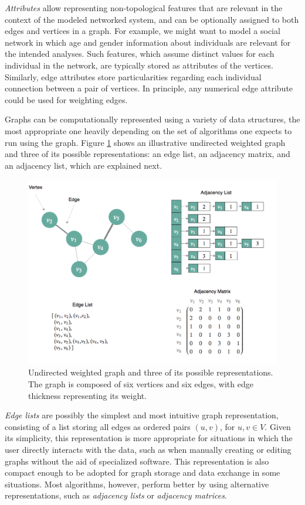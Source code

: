 \textit{Attributes} allow representing non-topological features that are relevant in the context of the modeled networked system, and can be optionally assigned to both edges and vertices in a graph.
For example, we might want to model a social network in which age and gender information about individuals are relevant for the intended analyses.
Such features, which assume distinct values for each individual in the network, are typically stored as attributes of the vertices.
Similarly, edge attributes store particularities regarding each individual connection between a pair of vertices.
In principle, any numerical edge attribute could be used for weighting edges.

Graphs can be computationally represented using a variety of data structures, the most appropriate one heavily depending on the set of algorithms one expects to run using the graph.
Figure \ref{fig:graphs} shows an illustrative undirected weighted graph and three of its possible representations: an edge list, an adjacency matrix, and an adjacency list, which are explained next.

\begin{figure}[h!]
  	\centering
    \includegraphics[width=0.9\linewidth]{figures/network_models/graphs.png}
    \caption[Undirected weighted graph and three of its possible representations]{Undirected weighted graph and three of its possible representations. The graph is composed of six vertices and six edges, with edge thickness representing its weight.}
    \label{fig:graphs}
  \end{figure}
  

\textit{Edge lists} are possibly the simplest and most intuitive graph representation, consisting of a list storing all edges as ordered pairs $(u,v)$, for $u,v \in V$.
Given its simplicity, this representation is more appropriate for situations in which the user directly interacts with the data, such as when manually creating or editing graphs without the aid of specialized software. 
This representation is also compact enough to be adopted for graph storage and data exchange in some situations.
%
Most algorithms, however, perform better by using alternative representations, such as \textit{adjacency lists} or \textit{adjacency matrices}. 

